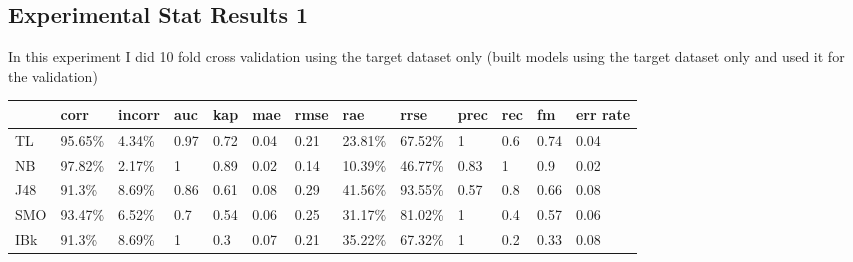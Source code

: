 \documentclass[a4paper,12pt, english]{article}
\begin{document}
\subsection{Experimental Stat Results 1}
In this experiment I did 10 fold cross validation using the target dataset only (built models using the target dataset only and used it for the validation)
\begin{small}
\begin{center}
    \begin{tabular}{ | l | l | l | l | l | l | l | l | l | l | l | l | l |}
    \hline
      & corr & incorr  & auc & kap & mae & rmse & rae & rrse & prec & rec & fm & err rate\\ \hline
    TL & 95.65\% & 4.34\% & 0.97 & 0.72 & 0.04 & 0.21 & 23.81\% & 67.52\% & 1 & 0.6 & 0.74 & 0.04\\ \hline
    NB & 97.82\% & 2.17\% & 1 & 0.89 & 0.02 & 0.14 & 10.39\% & 46.77\% & 0.83 & 1 & 0.9 & 0.02\\ \hline
    J48 & 91.3\% & 8.69\% & 0.86 & 0.61 & 0.08 & 0.29 & 41.56\% & 93.55\% & 0.57 & 0.8 & 0.66 & 0.08\\ \hline
    SMO & 93.47\% & 6.52\% & 0.7 & 0.54 & 0.06 & 0.25 & 31.17\% & 81.02\% & 1 & 0.4 & 0.57 & 0.06\\ \hline
    IBk & 91.3\% & 8.69\% & 1 & 0.3 & 0.07 & 0.21 & 35.22\% & 67.32\% & 1 & 0.2 & 0.33 & 0.08\\ \hline
    
    \end{tabular}       
\end{center}
\end{small}
\end{document}
